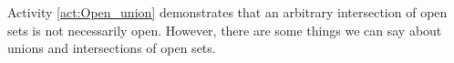 \begin{comment}

\ActivitySolution

\ba
\item Let $A = (-2,1)$ and $B = (-1,2)$ in $(\R, d_E)$. 
	\begin{enumerate}[i.]
	\item Let $a \in A \cup B$. Then $a \in (-2,1)$ or $a \in (-1,2)$. These open intervals are open balls, and so are neighborhoods of each of their points. Thus, $A \cup B$ is a neighborhood of each of its points. 
		
	\item In this case we have $A \cap B = (-1,1)$. Since $(-1,1)$ is an open ball, $(-1,1)$ is a neighborhood of each of its points. Thus, $A \cap B$ is a neighborhood of each of its points and $A \cap B$ is an open set. 
		
	\end{enumerate}
	
\item Let $X = \R$ with the Euclidean metric. Let $A_n = \left(1-\frac{1}{n}, 1+\frac{1}{n}\right)$ for each $n \in \Z^+$.
	\begin{enumerate}[i.]
	\item When $n = 1$ the interval is $(0,2)$. All intervals for $n > 1$ are contained in $(0,2)$, so $\bigcup_{n \geq 1} A_n = (0,2)$.
			
	\item Since $\bigcup_{n \geq 1} A_n$ is an open ball, it is also an open set $\R$? 
	
	\item Each interval $\left(1-\frac{1}{n}, 1+\frac{1}{n}\right)$ contains 1. However, we can make $n$ larger enough so that any integer not equal to 1 is not in $\left(1-\frac{1}{n}, 1+\frac{1}{n}\right)$. So $\bigcap_{n \geq 1} A_n = \{1\}$. 
			
	\item There is no open ball of positive radius contained in $\bigcap_{n \geq 1} A_n$, so $\bigcap_{n \geq 1} A_n$ is not open in $\R$.
		
	\end{enumerate}
	

\ea

\end{comment}

Activity \ref{act:Open_union} demonstrates that an arbitrary intersection of open sets is not necessarily open. However, there are some things we can say about unions and intersections of open sets.

